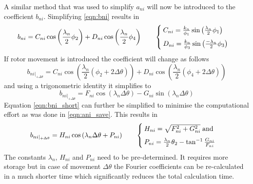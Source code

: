 A similar method that was used to simplify $a_{ni}$ will now be introduced to the coefficient $b_{ni}$. 
Simplifying \eqref{eqn:bni} results in
\begin{equation}\label{eqn:bni_new}
    b_{ni}=C_{ni}\cos\left(\frac{\lambda_{n}}{2}\phi_{2}\right)+
    D_{ni}\cos\left(\frac{\lambda_{n}}{2}\phi_{4}\right)
    \qquad
    \begin{cases}
        \vspace{0.5em}
        C_{ni}=\frac{k_{n}}{\phi_{1}}\sin\left(\frac{\lambda_{n}}{2} \phi_{1}\right) \\ 
        D_{ni}=\frac{k_{n}}{\phi_{3}}\sin\left(\frac{-\lambda_{n}}{2} \phi_{3}\right)
    \end{cases}
\end{equation} 
If rotor movement is introduced the coefficient will change as follows
\begin{equation}\label{eqn:bni_move}
    b_{ni|_{+\Delta\theta}}=
        C_{ni}\cos\left(
        \frac{\lambda_{n}}{2}\left(\phi_{2}+2\Delta\theta\right)\right)+
        D_{ni}\cos\left(
        \frac{\lambda_{n}}{2}\left(\phi_{4}+2\Delta\theta\right)\right)
\end{equation}  
and using a trigonometric identity it simplifies to
\begin{equation}\label{eqn:bni_short}
    b_{ni|_{+\Delta\theta}}=F_{ni}\cos\left(\lambda_{n}\Delta\theta\right)-
    G_{ni}\sin\left(\lambda_{n}\Delta\theta\right)
\end{equation}
Equation \eqref{eqn:bni_short} can further be simplified to minimise the computational effort as 
was done in \eqref{eqn:ani_save}. This results in
\begin{equation}\label{eqn:bni_save}
    b_{ni|_{+\Delta\theta}}=H_{ni}\cos
    \left(\lambda_{n}\Delta\theta+P_{ni}\right)
    \qquad
    \begin{cases}
        \vspace{0.5em}
        H_{ni}=\sqrt{F^{2}_{ni}+G^{2}_{ni}} \; \textnormal{and} \\
        P_{ni} = \frac{\lambda_{n}}{2}\theta_{2}-\tan^{-1}\frac{G_{ni}}{F_{ni}}
    \end{cases}
\end{equation}
The constants $\lambda_{n}$, $H_{ni}$ and $P_{ni}$ need to be pre-determined. It requires more 
storage but in case of movement $\Delta\theta$ the Fourier coefficients can be re-calculated in 
a much shorter time which significantly reduces the total calculation time. 

